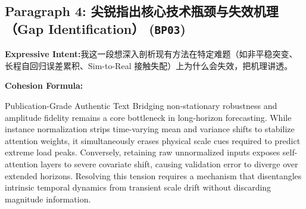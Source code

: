 \subsection*{Paragraph 4: 尖锐指出核心技术瓶颈与失效机理（Gap Identification） (\texttt{BP03})}
\noindent\textbf{Expressive Intent:}\enspace 我这一段想深入剖析现有方法在特定难题（如非平稳突变、长程自回归误差累积、Sim-to-Real 接触失配）上为什么会失效，把机理讲透。\par
\noindent\textbf{Cohesion Formula:}\par\vspace{4pt}
\begin{ExampleBox}{Publication-Grade Authentic Text}
Bridging non-stationary robustness and amplitude fidelity remains a core bottleneck in long-horizon forecasting. While instance normalization strips time-varying mean and variance shifts to stabilize attention weights, it simultaneously erases physical scale cues required to predict extreme load peaks. Conversely, retaining raw unnormalized inputs exposes self-attention layers to severe covariate shift, causing validation error to diverge over extended horizons. Resolving this tension requires a mechanism that disentangles intrinsic temporal dynamics from transient scale drift without discarding magnitude information.
\end{ExampleBox}
